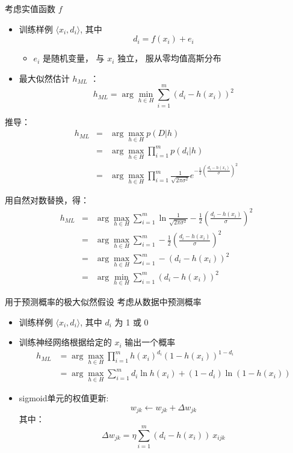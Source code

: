 \documentclass[presentation]{beamer}
\begin{document}
\begin{frame}[label={sec:orgdf7a63a}]{考虑实值函数 \(f\)}
\begin{itemize}
\item 训练样例 \(\langle x_{i}, d_{i} \rangle\), 其中
$$d_{i} = f(x_{i}) + e_{i}$$
\begin{itemize}
\item \(e_{i}\) 是随机变量， 与 \(x_{i}\) 独立， 服从零均值高斯分布
\end{itemize}
\item 最大似然估计 \(h_{ML}\) ：
$$h_{ML} = \arg \min_{h \in H} \sum_{i=1}^{m} \left(d_{i} -h(x_{i})\right)^{2}$$
\end{itemize}
\end{frame}

\begin{frame}[label={sec:orgfa75678}]{推导：}
\begin{eqnarray}
h_{ML} &= &\arg \max_{h \in H} p(D|h) \nonumber \\
 &= &\arg \max_{h \in H} \prod_{i=1}^{m} p(d_{i}|h) \nonumber \\
&= &\arg \max_{h \in H} \prod_{i=1}^{m} \frac{1}{\sqrt{2 \pi \sigma^{2}}}
e^{-\frac{1}{2}(\frac{d_{i} - h(x_{i})}{\sigma})^{2}} \nonumber
\end{eqnarray}
\end{frame}

\begin{frame}[label={sec:org2d01546}]{用自然对数替换，得：}
\begin{eqnarray}
h_{ML}  &= &\arg \max_{h \in H}
\sum_{i=1}^{m} \ln \frac{1}{\sqrt{2 \pi \sigma^{2}}} -
\frac{1}{2}\left(\frac{d_{i} - h(x_{i})}{\sigma}\right)^{2} \nonumber \\
  &= &\arg \max_{h \in H} \sum_{i=1}^{m} -
\frac{1}{2}\left(\frac{d_{i} - h(x_{i})}{\sigma}\right)^{2} \nonumber \\
 &= &\arg \max_{h \in H} \sum_{i=1}^{m} - \left(d_{i} - h(x_{i})\right)^{2}
 \nonumber \\
 &= &\arg \min_{h \in H} \sum_{i=1}^{m} \left(d_{i} - h(x_{i})\right)^{2}  \nonumber
\end{eqnarray}
\end{frame}

\begin{frame}[label={sec:org379e2cb}]{用于预测概率的极大似然假设}
考虑从数据中预测概率
\begin{itemize}
\item 训练样例 \(\langle x_{i}, d_{i} \rangle\), 其中 \(d_{i}\) 为 1 或 0
\item 训练神经网络根据给定的 \(x_i\) 输出一个概率
\begin{align*}
 h_{ML} &= \arg \max_{h \in H} \prod_{i=1}^{m} h(x_{i})^{d_i} (1 - h(x_{i}))^{1-d_{i}}\\
        &= \arg \max_{h \in H} \sum_{i=1}^{m} d_{i} \ln h(x_{i}) + (1-d_{i})\ln (1 - h(x_{i}))
\end{align*}
\item sigmoid单元的权值更新:
$$w_{jk} \leftarrow w_{jk} +  \Delta w_{jk}$$
其中：
 $$\Delta w_{jk} = \eta \sum_{i=1}^{m} (d_{i} - h(x_{i})) \  x_{ijk}$$
\end{itemize}
\end{frame}
\end{document}
